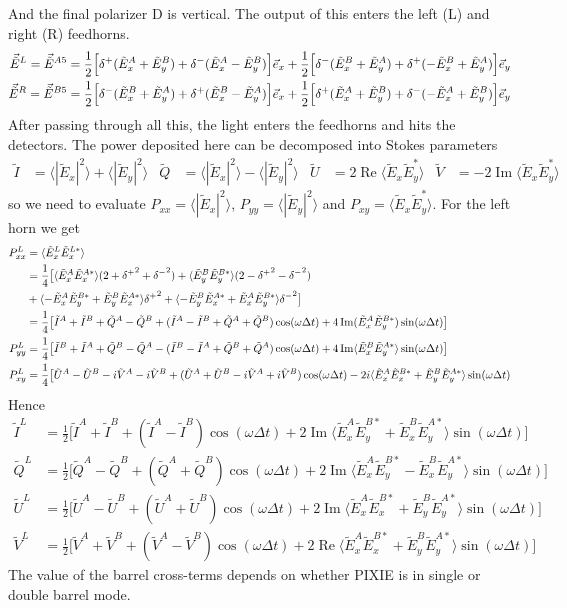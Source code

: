\documentclass{article}
\newcommand{\I}{\tilde I}
\newcommand{\Q}{\tilde Q}
\newcommand{\U}{\tilde U}
\newcommand{\V}{\tilde V}
\newcommand{\J}{{\tilde E}}
\renewcommand{\Re}{\operatorname{Re}}
\renewcommand{\Im}{\operatorname{Im}}
\begin{document}
And the final polarizer D is vertical. The output of this enters
the left (L) and right (R) feedhorns.
\begin{align}
	\vec \J^L = \vec \J^{A5} &= \frac12 \Big[\delta^+(\J^A_x+\J^B_y)+\delta^-(\J^A_x-\J^B_y)\Big]\vec e_x
		+ \frac12 \Big[\delta^-(\J^B_x+\J^A_y)+\delta^+(-\J^B_x+\J^A_y)\Big]\vec e_y \notag \\
	\vec \J^R = \vec \J^{B5} &= \frac12 \Big[\delta^-(\J^B_x+\J^A_y)+\delta^+(\J^B_x-\J^A_y)\Big]\vec e_x
		+ \frac12 \Big[\delta^+(\J^A_x+\J^B_y)+\delta^-(-\J^A_x+\J^B_y)\Big]\vec e_y
\end{align}
After passing through all this, the light enters the feedhorns and
hits the detectors. The power deposited here can be decomposed into
Stokes parameters
\begin{align}
	\I &= \langle |\J_x|^2\rangle + \langle|\J_y|^2\rangle &
	\Q &= \langle |\J_x|^2\rangle - \langle|\J_y|^2\rangle &
	\U &= 2\Re\langle \J_x\J_y^*\rangle &
	\V &= -2\Im\langle \J_x\J_y^*\rangle
\end{align}
so we need to evaluate $P_{xx} = \langle |\J_x|^2\rangle$,
$P_{yy} = \langle |\J_y|^2\rangle$ and $P_{xy} = \langle \J_x\J_y^*\rangle$.
For the left horn we get
\begin{align}
	P^L_{xx} &= \langle \J^L_x\J^{L*}_x \rangle \notag \\
		&= \frac14\big[
			\langle\J^A_x\J^{A*}_x\rangle (2+{\delta^+}^2+{\delta^-}^2) +
			\langle\J^B_y\J^{B*}_y\rangle (2-{\delta^+}^2-{\delta^-}^2) \notag \\
		&+\langle-\J^A_x\J^{B*}_y+\J^B_y\J^{A*}_x\rangle{\delta^+}^2 +
			\langle-\J^B_y\J^{A*}_x+\J^A_x\J^{B*}_y\rangle{\delta^-}^2\big] \notag \\
		&= \frac14\big[\I^A+\I^B+\Q^A-\Q^B + (\I^A-\I^B+\Q^A+\Q^B)\cos(\omega\Delta t) +
		4\Im(\J^A_x\J^{B*}_y)\sin(\omega\Delta t) \big] \\
	P^L_{yy} &= \frac14\big[\I^B+\I^A+\Q^B-\Q^A - (\I^B-\I^A+\Q^B+\Q^A)\cos(\omega\Delta t) +
		4\Im\langle\J^B_x\J^{A*}_y\rangle\sin(\omega\Delta t) \big ]\\
	P^L_{xy} &= \frac14\big[\U^A-\U^B - i\V^A-i\V^B + (\U^A+\U^B -i\V^A+i\V^B)\cos(\omega\Delta t)
		-2i\langle\J^A_x\J^{B*}_x+\J^B_y\J^{A*}_y\rangle\sin(\omega\Delta t)
\end{align}
Hence
\begin{align}
	\I^L &= \frac12\big[\I^A+\I^B+(\I^A-\I^B)\cos(\omega\Delta t)
		+2\Im\langle\J^A_x\J^{B*}_y+\J^B_x\J^{A*}_y\rangle\sin(\omega\Delta t) \big] \\
	\Q^L &= \frac12\big[\Q^A-\Q^B+(\Q^A+\Q^B)\cos(\omega\Delta t)
		+2\Im\langle\J^A_x\J^{B*}_y-\J^B_x\J^{A*}_y\rangle\sin(\omega\Delta t) \big] \\
	\U^L &= \frac12\big[\U^A-\U^B+(\U^A+\U^B)\cos(\omega\Delta t)
		+2\Im\langle\J^A_x\J^{B*}_x+\J^B_y\J^{A*}_y\rangle\sin(\omega\Delta t) \big] \\
	\V^L &= \frac12\big[\V^A+\V^B+(\V^A-\V^B)\cos(\omega\Delta t)
		+2\Re\langle\J^A_x\J^{B*}_x+\J^B_y\J^{A*}_y\rangle\sin(\omega\Delta t) \big]
\end{align}
The value of the barrel cross-terms depends on whether PIXIE is in single
or double barrel mode.
\end{document}
